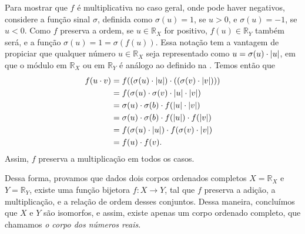 \documentclass[../main.tex]{subfiles}
\begin{document}
\begin{dem}
\begin{enumerate}
\begin{enumerate}
            Para mostrar que $f$ é multiplicativa no caso geral, onde pode haver negativos, considere a função sinal $\sigma$, definida como $\sigma(u) = 1$, se $u > 0$, e $\sigma(u) = -1$, se $u < 0$. Como $f$ preserva a ordem, se $u \in \mathbb{R}_X$ for positivo, $f(u) \in \mathbb{R}_Y$ também será, e a função $\sigma(u)=1=\sigma( f(u) )$. Essa notação tem a vantagem de propiciar que qualquer número $u \in \mathbb{R}_X$ seja representado como $u = \sigma(u) \cdot \abs{u}$, em que o módulo em $\mathbb{R}_X$ ou em $\mathbb{R}_Y$ é análogo ao definido na . Temos então que
            \begin{align*}
                f(u \cdot v) &= f((\sigma(u) \cdot \abs{u}) \cdot ((\sigma(v) \cdot \abs{v}))) \\
                &= f(\sigma(u) \cdot \sigma(v) \cdot \abs{u}\cdot \abs{v}) \\
                &= \sigma(u) \cdot \sigma(b) \cdot f(\abs{u} \cdot \abs{v}) \\
                &= \sigma(u) \cdot \sigma(b) \cdot f(\abs{u}) \cdot f(\abs{v}) \\
                &= f(\sigma(u) \cdot \abs{u}) \cdot f(\sigma(v) \cdot \abs{v}) \\
                &= f(u) \cdot f(v).
            \end{align*}
            Assim, $f$ preserva a multiplicação em todos os casos.
        \end{enumerate}
        Dessa forma, provamos que dados dois corpos ordenados completos $X = \mathbb{R}_X$ e $Y = \mathbb{R}_Y$, existe uma função bijetora $f \colon X \to Y$, tal que $f$ preserva a adição, a multiplicação, e a relação de ordem desses conjuntos. Dessa maneira, concluímos que $X$ e $Y$ são isomorfos, e assim, existe apenas um corpo ordenado completo, que chamamos \emph{o corpo dos números reais}.
    
\end{enumerate}
    
\end{dem}
\end{document}
